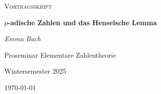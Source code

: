 \begin{titlepage}
	\centering
	{\Large \textsc{Vortragsskript}\par}
	\vspace{0.5cm}
	{\huge\bfseries $p$-adische Zahlen und das Henselsche Lemma\par}
    \vspace{0.5cm}
	{\Large\itshape Emma Bach\par}
	\vfill
	
	Proseminar Elementare Zahlentheorie\par
	Wintersemester 2025\par
	
	\vfill

	{\large \today\par}
\end{titlepage}
